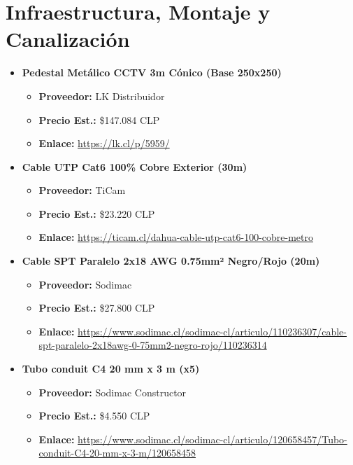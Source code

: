 \section{Infraestructura, Montaje y Canalización}
\begin{itemize}
    \item \textbf{Pedestal Metálico CCTV 3m Cónico (Base 250x250)}
    \begin{itemize}
        \item \textbf{Proveedor:} LK Distribuidor
        \item \textbf{Precio Est.:} \$147.084 CLP
        \item \textbf{Enlace:} \url{https://lk.cl/p/5959/}
    \end{itemize}

    \item \textbf{Cable UTP Cat6 100\% Cobre Exterior (30m)}
    \begin{itemize}
        \item \textbf{Proveedor:} TiCam
        \item \textbf{Precio Est.:} \$23.220 CLP
        \item \textbf{Enlace:} \url{https://ticam.cl/dahua-cable-utp-cat6-100-cobre-metro}
    \end{itemize}
    
    \item \textbf{Cable SPT Paralelo 2x18 AWG 0.75mm² Negro/Rojo (20m)}
    \begin{itemize}
        \item \textbf{Proveedor:} Sodimac
        \item \textbf{Precio Est.:} \$27.800 CLP
        \item \textbf{Enlace:} \url{https://www.sodimac.cl/sodimac-cl/articulo/110236307/cable-spt-paralelo-2x18awg-0-75mm2-negro-rojo/110236314}
    \end{itemize}
    
    \item \textbf{Tubo conduit C4 20 mm x 3 m (x5)}
    \begin{itemize}
        \item \textbf{Proveedor:} Sodimac Constructor
        \item \textbf{Precio Est.:} \$4.550 CLP
        \item \textbf{Enlace:} \url{https://www.sodimac.cl/sodimac-cl/articulo/120658457/Tubo-conduit-C4-20-mm-x-3-m/120658458}
    \end{itemize}
    

\end{itemize}
